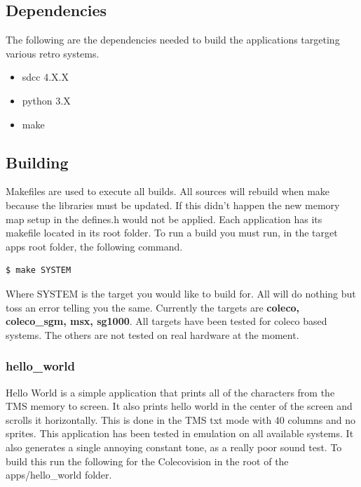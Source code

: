 \documentclass{article}
\begin{document}
  \subsection{Dependencies}

  \par
  The following are the dependencies needed to build the applications targeting various retro systems.

  \begin{itemize}
    \item sdcc 4.X.X
    \item python 3.X
    \item make
  \end{itemize}

  \subsection{Building}

  \par
  Makefiles are used to execute all builds. All sources will rebuild when make because the libraries must be updated.
  If this didn't happen the new memory map setup in the defines.h would not be applied. Each application
  has its makefile located in its root folder. To run a build you must run, in the target apps root folder, the following
  command.

  \begin{lstlisting}[language=bash]
    $ make SYSTEM
  \end{lstlisting}

  Where SYSTEM is the target you would like to build for. All will do nothing but toss an error telling you the same.
  Currently the targets are \textbf{coleco, coleco\_sgm, msx, sg1000}. All targets have been tested for coleco based systems.
  The others are not tested on real hardware at the moment.

  \subsubsection{hello\_world}

  \par
  Hello World is a simple application that prints all of the characters from the TMS memory to screen. It also prints hello world in the
  center of the screen and scrolls it horizontally. This is done in the TMS txt mode with 40 columns and no sprites. This application has been
  tested in emulation on all available systems. It also generates a single annoying constant tone, as a really poor sound test. To build this
  run the following for the Colecovision in the root of the apps/hello\_world folder.
\end{document}
